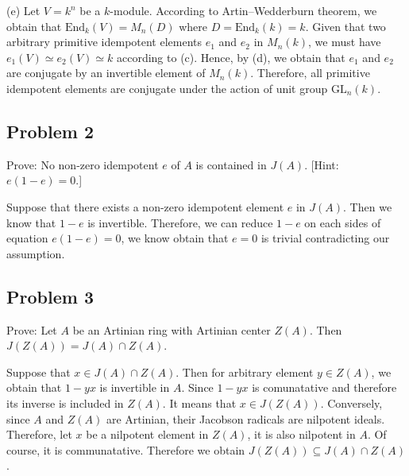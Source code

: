 \begin{solution}
    (e) Let $V=k^n$ be a $k$-module. According to Artin–Wedderburn theorem, we obtain that $\text{End}_k(V)= M_n(D)$ where $D=\text{End}_k(k)=k$. Given that two arbitrary primitive idempotent elements $e_1$ and $e_2$ in $M_n(k)$, we must have $e_1(V)\simeq e_2(V)\simeq k$ according to (c).
    Hence, by (d), we obtain that $e_1$ and $e_2$ are conjugate by an invertible element of $M_n(k)$.
    Therefore, all primitive idempotent elements are conjugate under the action of unit group $\text{GL}_n(k)$.

    
    
\end{solution}


\subsection*{Problem 2}
Prove: No non-zero idempotent $e$ of $A$ is contained in $J(A)$. [Hint: $e(1 - e) = 0$.]

\begin{solution}
    Suppose that there exists a non-zero idempotent element $e$ in $J(A)$. Then we know that $1-e$ is invertible.
    Therefore, we can reduce $1-e$ on each sides of equation $e(1-e)=0$, we know obtain that $e=0$ is trivial contradicting our assumption.
\end{solution}

\subsection*{Problem 3}
Prove: Let $A$ be an Artinian ring with Artinian center $Z(A)$. Then $J(Z(A)) = J(A) \cap Z(A)$.
\begin{solution}
    Suppose that $x\in J(A)\cap Z(A)$. Then for arbitrary element $y\in Z(A)$, we obtain that $1-yx$ is invertible in $A$.
    Since $1-yx$ is comunatative and therefore its inverse is included in $Z(A)$. It means that $x\in J(Z(A))$. 
    Conversely, since $A$ and $Z(A)$ are Artinian, their Jacobson radicals are nilpotent ideals. Therefore, let $x$ be a nilpotent element in $Z(A)$, it is also nilpotent in $A$.
    Of course, it is communatative.
    Therefore we obtain $J(Z(A))\subseteq J(A)\cap Z(A)$.
\end{solution}



